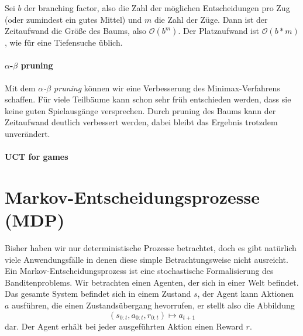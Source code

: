\documentclass[ngerman]{../LaTeX-Templates/Paper/paper}
\begin{document}
Sei $b$ der branching factor, also die Zahl der möglichen Entscheidungen pro Zug (oder zumindest ein gutes Mittel) und $m$ die Zahl der Züge. Dann ist der Zeitaufwand die Größe des Baums, also $\mathcal O(b^m)$. Der Platzaufwand ist $\mathcal O(b*m)$, wie für eine Tiefensuche üblich.

\paragraph{$\alpha$-$\beta$ pruning}
Mit dem \emph{$\alpha$-$\beta$ pruning} können wir eine Verbesserung des Minimax-Verfahrens schaffen. 
Für viele Teilbäume kann schon sehr früh entschieden werden, dass sie keine guten Spielausgänge versprechen. Durch pruning des Baums kann der Zeitaufwand deutlich verbessert werden, dabei bleibt das Ergebnis trotzdem unverändert.



\paragraph{UCT for games}







\section{Markov-Entscheidungsprozesse (MDP)}
Bisher haben wir nur deterministische Prozesse betrachtet, doch es gibt natürlich viele Anwendungsfälle in denen diese simple Betrachtungsweise nicht ausreicht.
Ein Markov-Entscheidungsprozess ist eine stochastische Formalisierung des Banditenproblems. Wir betrachten einen Agenten, der sich in einer Welt befindet. Das gesamte System befindet sich in einem Zustand $s$, der Agent kann Aktionen $a$ ausführen, die einen Zustandsübergang hevorrufen, er stellt also die Abbildung
\begin{equation*}
	(s_{0:t},a_{0:t},r_{0:t})\mapsto a_{t+1}
\end{equation*}
dar.
Der Agent erhält bei jeder ausgeführten Aktion einen Reward $r$.
\end{document}
